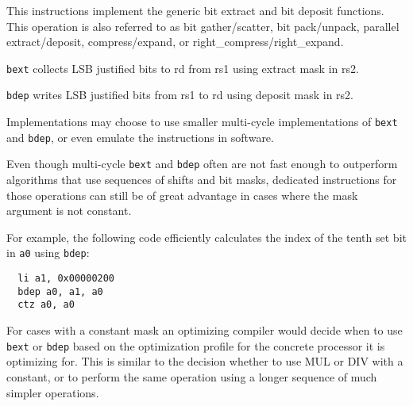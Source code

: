 This instructions implement the generic bit extract and bit deposit functions.
This operation is also referred to as bit gather/scatter, bit pack/unpack,
parallel extract/deposit, compress/expand, or right\_compress/right\_expand.

\texttt{bext} collects LSB justified bits to rd from rs1 using extract mask in rs2.

\texttt{bdep} writes LSB justified bits from rs1 to rd using deposit mask in rs2.



Implementations may choose to use smaller multi-cycle implementations of
\texttt{bext} and \texttt{bdep}, or even emulate the instructions in software.

Even though multi-cycle \texttt{bext} and \texttt{bdep} often are not fast
enough to outperform algorithms that use sequences of shifts and bit masks,
dedicated instructions for those operations can still be of great advantage in
cases where the mask argument is not constant.

For example, the following code efficiently calculates the index of the tenth
set bit in {\tt a0} using \texttt{bdep}:

\begin{minipage}{\linewidth}
\begin{verbatim}
  li a1, 0x00000200
  bdep a0, a1, a0
  ctz a0, a0
\end{verbatim}
\end{minipage}

For cases with a constant mask an optimizing compiler would decide when to use
\texttt{bext} or \texttt{bdep} based on the optimization profile for the
concrete processor it is optimizing for. This is similar to the decision
whether to use MUL or DIV with a constant, or to perform the same operation
using a longer sequence of much simpler operations.

%
%
%
%
%
%
%
%

